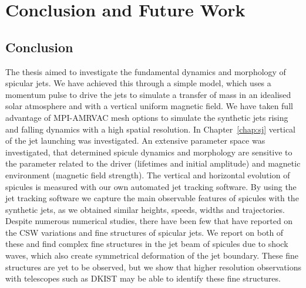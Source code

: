 \documentclass[12pt]{ociamthesis}
\newcommand{\np}{\\ \\}
\begin{document}
\baselineskip=18pt


\chapter{Conclusion and Future Work}
\label{chap:con_and_fut_work}
\section{Conclusion}
\label{sec:con}
The thesis aimed to investigate the fundamental dynamics and morphology of spicular jets. We have achieved this through a simple model, which uses a momentum pulse to drive the jets to simulate a transfer of mass in an idealised solar atmosphere and with a vertical uniform magnetic field. We have taken full advantage of MPI-AMRVAC mesh options to simulate the synthetic jets rising and falling dynamics with a high spatial resolution. In Chapter~\ref{chap:sj} vertical of the jet launching was investigated. An extensive parameter space was investigated, that determined spicule dynamics and morphology are sensitive to the parameter related to the driver (lifetimes and initial amplitude) and magnetic environment (magnetic field strength). The vertical and horizontal evolution of spicules is measured with our own automated jet tracking software. By using the jet tracking software we capture the main observable features of spicules with the synthetic jets, as we obtained similar heights, speeds, widths and trajectories. Despite numerous numerical studies, there have been few that have reported on the CSW variations and fine structures of spicular jets. We report on both of these and find complex fine structures in the jet beam of spicules due to shock waves, which also create symmetrical deformation of the jet boundary. These fine structures are yet to be observed, but we show that higher resolution observations with telescopes such as DKIST may be able to identify these fine structures.  \np
%
\end{document}
